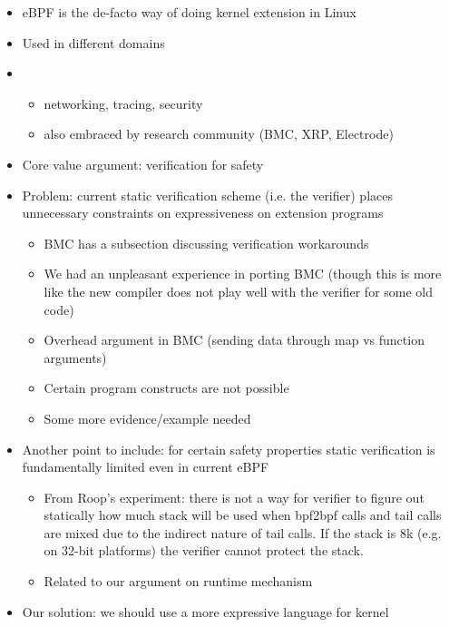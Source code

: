 \begin{itemize}
    \item eBPF is the de-facto way of doing kernel extension in Linux
    \item Used in different domains
    \item
        \begin{itemize}
            \item networking, tracing, security
            \item also embraced by research community (BMC, XRP, Electrode)
        \end{itemize}
    \item Core value argument: verification for safety
    \item Problem: current static verification scheme (i.e. the verifier)
        places unnecessary constraints on expressiveness on extension programs
        \begin{itemize}
            \item BMC has a subsection discussing verification workarounds
            \item We had an unpleasant experience in porting BMC (though this
                is more like the new compiler does not play well with the
                verifier for some old code)
            \item Overhead argument in BMC (sending data through map vs
                function arguments)
            \item Certain program constructs are not possible
            \item Some more evidence/example needed
        \end{itemize}
    \item Another point to include: for certain safety properties static
        verification is fundamentally limited even in current eBPF
        \begin{itemize}
            \item From Roop's experiment: there is not a way for verifier to
                figure out statically how much stack will be used when bpf2bpf
                calls and tail calls are mixed due to the indirect nature of
                tail calls. If the stack is 8k (e.g. on 32-bit platforms) the
                verifier cannot protect the stack.
            \item Related to our argument on runtime mechanism
        \end{itemize}
    \item Our solution: we should use a more expressive language for kernel

\end{itemize}
